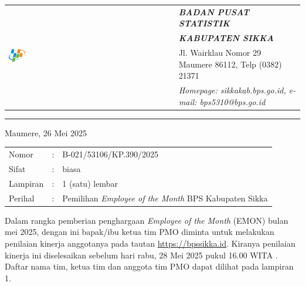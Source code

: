 \documentclass{article}
\begin{document}




\begin{tabular}{ll}
   \multirow{4}{*}{\includegraphics[width=0.10\textwidth]{logo/bps-logo.png}} %
   &
   \large{\textbf{\textit{BADAN PUSAT STATISTIK}}} \\
   & \large{\textbf{\textit{KABUPATEN SIKKA}}} \\
   & Jl. Wairklau Nomor 29 Maumere 86112, Telp (0382) 21371 \\
   & \textit{Homepage: sikkakab.bps.go.id, e-mail: bps5310@bps.go.id} \\
\end{tabular}

\hfill

\vspace{-1em} %

\rule{\linewidth}{1pt} %


\hfill
Maumere, 26 Mei 2025

\begin{tabular}{@{} lcl}
	Nomor&:&B-021/53106/KP.390/2025 \\
	Sifat&:&biasa \\
	Lampiran&:&1 (satu) lembar\\
    Perihal&:& Pemilihan \textit{Employee of the Month} BPS Kabupaten Sikka\\
\end{tabular}

\bigskip %

Dalam rangka pemberian penghargaan \textit{Employee of the Month} (EMON) bulan mei 2025, dengan ini bapak/ibu ketua tim PMO diminta untuk melakukan penilaian kinerja anggotanya pada tautan \href{https://bpssikka.id/}{https://bpssikka.id}.
Kiranya penilaian kinerja ini diselesaikan sebelum hari rabu, 28 Mei 2025 pukul 16.00 WITA \@.
Daftar nama tim, ketua tim dan anggota tim PMO dapat dilihat pada lampiran 1.
\end{document}
